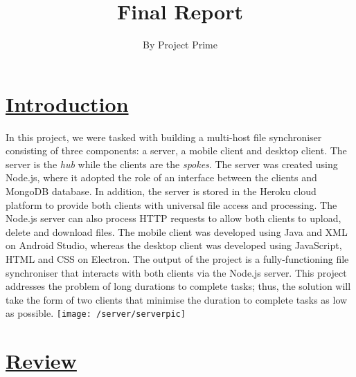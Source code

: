 \documentclass{article}
\title{Final Report}
\author{By Project Prime}
\begin{document}
 \maketitle
 \section{\underline{Introduction}}
In this project, we were tasked with building a multi-host file synchroniser consisting of three components: a server, a mobile client and desktop client. The server is the \textit{hub} while the clients are the \textit{spokes}. The server was created using Node.js, where it adopted the role of an interface between the clients and MongoDB database. In addition, the server is stored in the Heroku cloud platform to provide both clients with universal file access and processing. The Node.js server can also process HTTP requests to allow both clients to upload, delete and download files. The mobile client was developed using Java and XML on Android Studio, whereas the desktop client was developed using JavaScript, HTML and CSS on Electron. The output of the project is a fully-functioning file synchroniser that interacts with both clients via the Node.js server. This project addresses the problem of long durations to complete tasks; thus, the solution will take the form of two clients that minimise the duration to complete tasks as low as possible.
\texttt{[image: /server/serverpic]}

\section{\underline{Review}}
\end{document}
